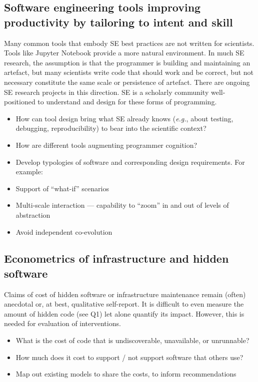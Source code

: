 \documentclass[a4paper,UKenglish]{dagman}
\newcommand{\eg}{\emph{e.g.},\xspace}
\begin{document}
\subsection{Software engineering tools improving productivity by tailoring to intent and skill}

Many common tools that embody SE best practices are not written for scientists. Tools like Jupyter Notebook provide a more natural environment. In much SE research, the assumption is that the programmer is building and maintaining an artefact, but many scientists write code that should work and be correct, but not necessary constitute the same scale or persistence of artefact. There are ongoing SE research projects in this direction. SE is a scholarly community well-positioned to understand and design for these forms of programming.

\begin{itemize}
\item How can tool design bring what SE already knows (\eg about testing, debugging, reproducibility) to bear into the scientific context?
\item How are different tools augmenting programmer cognition?
\item Develop typologies of software and corresponding design requirements. For example:
\item Support of ``what-if'' scenarios
\item Multi-scale interaction --- capability to ``zoom'' in and out of levels of abstraction
\item Avoid independent co-evolution
\end{itemize}

\subsection{Econometrics of infrastructure and hidden software}

Claims of cost of hidden software or infrastructure maintenance remain (often) anecdotal or, at best, qualitative self-report. It is difficult to even measure the amount of hidden code (see Q1) let alone quantify its impact. However, this is needed for evaluation of interventions.


\begin{itemize}
\item What is the cost of code that is undiscoverable, unavailable, or unrunnable?
\item How much does it cost to support / not support software that others use? 
\item Map out existing models to share the costs, to inform recommendations
\end{itemize}
\end{document}
